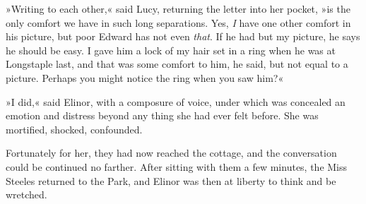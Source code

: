 »Writing to each other,« said Lucy, returning the letter into her pocket, »is the only comfort we have in such long separations. Yes, \textit{I} have one other comfort in his picture, but poor Edward has not even \textit{that}. If he had but my picture, he says he should be easy. I gave him a lock of my hair set in a ring when he was at Longstaple last, and that was some comfort to him, he said, but not equal to a picture. Perhaps you might notice the ring when you saw him?«

»I did,« said Elinor, with a composure of voice, under which was concealed an emotion and distress beyond any thing she had ever felt before. She was mortified, shocked, confounded.

Fortunately for her, they had now reached the cottage, and the conversation could be continued no farther. After sitting with them a few minutes, the Miss Steeles returned to the Park, and Elinor was then at liberty to think and be wretched.